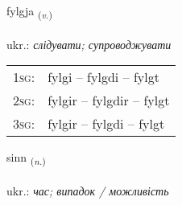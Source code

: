 \documentclass[frontgrid, backgrid]{flacards}\usepackage[]{graphicx}\usepackage[]{xcolor}
\begin{document}
\renewcommand{\blhead}{\vskip5pt {\small\bfseries\footnotesize Sagnorð | дієслово }}
\renewcommand{\bcfoot}{\vskip5pt \hspace{2pt}{\small\bfseries\footnotesize 1K}}


{fylgja \small{\textsubscript{(\textit{v.})}} \\[1ex] %
\textphonetic{[fɪlca]} \\
ukr.: \emph{слідувати; супроводжувати} \\  [2ex]
\renewcommand*{\arraystretch}{0.8}
\begin{tabular}{p{1cm}l}
\textsc{1sg}: & fylgi -- fylgdi -- fylgt \\ 
\textsc{2sg}: & fylgir -- fylgdir -- fylgt \\ 
\textsc{3sg}: & fylgir -- fylgdi -- fylgt \\ 
\end{tabular}
}

\renewcommand{\flhead}{\vskip5pt \fboxsep=0pt {\small\bfseries\footnotesize Nafnorð | іменник}}
\renewcommand{\fcfoot}{\vskip5pt \fboxsep=0pt \hspace{2pt}{\small\bfseries\footnotesize 1K}}

\renewcommand{\blhead}{\vskip5pt {\small\bfseries\footnotesize Nafnorð | іменник }}
\renewcommand{\bcfoot}{\vskip5pt \hspace{2pt}{\small\bfseries\footnotesize 1K}}


{sinn \small{\textsubscript{(\textit{n.})}} \\[1ex] %
\textphonetic{[sɪn]} \\
ukr.: \emph{час; випадок / можливість} \\  [2ex]
\renewcommand*{\arraystretch}{0.8}
}
\end{document}
